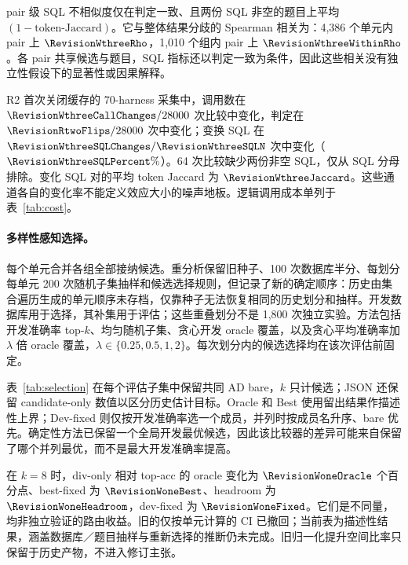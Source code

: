 pair 级 SQL 不相似度仅在判定一致、且两份 SQL 非空的题目上平均 $(1-\text{token-Jaccard})$。它与整体结果分歧的 Spearman 相关为：4,386 个单元内 pair 上 $\RevisionWthreeRho$，1,010 个组内 pair 上 $\RevisionWthreeWithinRho$。各 pair 共享候选与题目，SQL 指标还以判定一致为条件，因此这些相关没有独立性假设下的显著性或因果解释。

R2 首次关闭缓存的 70-harness 采集中，调用数在 $\RevisionWthreeCallChanges/28000$ 次比较中变化，判定在 $\RevisionRtwoFlips/28000$ 次中变化；变换 SQL 在 $\RevisionWthreeSQLChanges/\RevisionWthreeSQLN$ 次中变化（$\RevisionWthreeSQLPercent\%$）。64 次比较缺少两份非空 SQL，仅从 SQL 分母排除。变化 SQL 对的平均 token Jaccard 为 $\RevisionWthreeJaccard$。这些通道各自的变化率不能定义效应大小的噪声地板。逻辑调用成本单列于表~\ref{tab:cost}。
\paragraph{多样性感知选择。}每个单元合并各组全部接纳候选。重分析保留旧种子、100 次数据库半分、每划分每单元 200 次随机子集抽样和候选选择规则，但记录了新的确定顺序：历史由集合遍历生成的单元顺序未存档，仅靠种子无法恢复相同的历史划分和抽样。开发数据库用于选择，其补集用于评估；这些重叠划分不是 1,800 次独立实验。方法包括开发准确率 top-$k$、均匀随机子集、贪心开发 oracle 覆盖，以及贪心平均准确率加 $\lambda$ 倍 oracle 覆盖，$\lambda\in\{0.25,0.5,1,2\}$。每次划分内的候选选择均在该次评估前固定。

表~\ref{tab:selection} 在每个评估子集中保留共同 AD bare，$k$ 只计候选；JSON 还保留 candidate-only 数值以区分历史估计目标。Oracle 和 Best 使用留出结果作描述性上界；Dev-fixed 则仅按开发准确率选一个成员，并列时按成员名升序、bare 优先。确定性方法已保留一个全局开发最优候选，因此该比较器的差异可能来自保留了哪个并列最优，而不是最大开发准确率提高。

在 $k=8$ 时，div-only 相对 top-acc 的 oracle 变化为 $\RevisionWoneOracle$ 个百分点、best-fixed 为 $\RevisionWoneBest$、headroom 为 $\RevisionWoneHeadroom$，dev-fixed 为 $\RevisionWoneFixed$。它们是不同量，均非独立验证的路由收益。旧的仅按单元计算的 CI 已撤回；当前表为描述性结果，涵盖数据库／题目抽样与重新选择的推断仍未完成。旧归一化提升空间比率只保留于历史产物，不进入修订主张。
\begin{table}[t]\centering\small

\caption{canonical 描述性 W1 重分析。每池含 $k$ 个已选候选及共同 bare；对 18 单元、100 个重叠数据库划分取均值，无 CI。Dev-fixed 仅在开发数据上选择；Best 使用留出结果。}\label{tab:selection}
\end{table}

